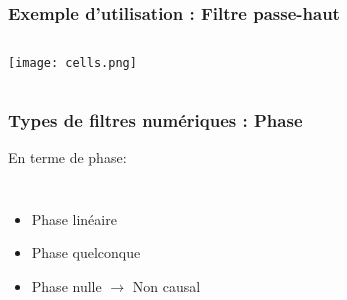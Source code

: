 \documentclass{beamer}
\begin{document}
\begin{frame}
\frametitle{Exemple d'utilisation : Filtre passe-haut}
\begin{columns}
\column{60mm}
\begin{center}
\texttt{[image: cells.png]}
\end{center}

\column{60mm}
\end{columns}
\vspace{1cm}

\end{frame}

\begin{frame}
\frametitle{Types de filtres numériques : Phase} 
En terme de phase:
\begin{columns}
\column{60mm} 
\begin{itemize}
\item<2-> Phase linéaire 
\vspace{0.6cm}

\item<4-> Phase quelconque 

\vspace{0.6cm}
\item<5-> Phase nulle  { $\rightarrow$ Non causal}
\end{itemize}

\column{60mm}

\end{columns}
\end{frame}

%
\end{document}
